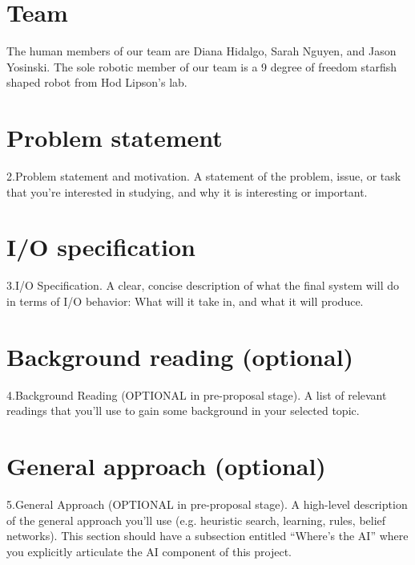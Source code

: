 \section{Team}

The human members of our team are Diana Hidalgo, Sarah Nguyen, and
Jason Yosinski.  The sole robotic member of our team is a 9 degree of
freedom starfish shaped robot from Hod Lipson's lab.



\section{Problem statement}


2.Problem statement and motivation. A statement of the problem, issue,
or task that you’re interested in studying, and why it is interesting
or important.



\section{I/O specification}


3.I/O Specification. A clear, concise description of what the final
system will do in terms of I/O behavior: What will it take in, and
what it will produce.



\section{Background reading (optional)}


4.Background Reading (OPTIONAL in pre-proposal stage). A list of
relevant readings that you’ll use to gain some background in your
selected topic.



\section{General approach (optional)}


5.General Approach (OPTIONAL in pre-proposal stage). A high-level
description of the general approach you’ll use (e.g. heuristic search,
learning, rules, belief networks). This section should have a
subsection entitled “Where’s the AI” where you explicitly articulate
the AI component of this project.




